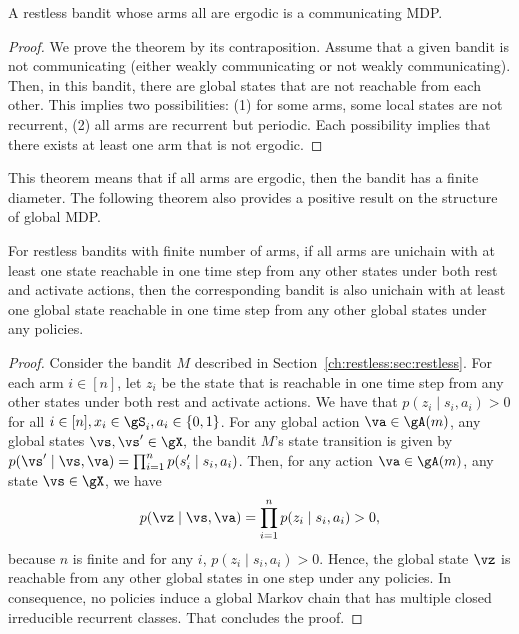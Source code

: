 \begin{thm}
    \label{thm:aperiodic_RB_comm} A restless bandit whose arms all are ergodic is a communicating MDP.
\end{thm}
\begin{proof}
    We prove the theorem by its contraposition. Assume that a given bandit is not communicating (either weakly communicating or not weakly communicating).
    Then, in this bandit, there are global states that are not reachable from each other.
    This implies two possibilities: (1) for some arms, some local states are not recurrent, (2) all arms are recurrent but periodic.
    Each possibility implies that there exists at least one arm that is not ergodic.
\end{proof}
This theorem means that if all arms are ergodic, then the bandit has a finite diameter.
The following theorem also provides a positive result on the structure of global MDP.

\begin{thm}
    \label{thm:unichain}
    For restless bandits with finite number of arms, if all arms are unichain with at least one state reachable in one time step from any other states under both rest and activate actions, then the corresponding bandit is also unichain with at least one global state reachable in one time step from any other global states under any policies.
\end{thm}
\begin{proof}
    Consider the bandit $M$ described in Section~\ref{ch:restless:sec:restless}.
    For each arm $i\in[n]$, let $z_i$ be the state that is reachable in one time step from any other states under both rest and activate actions.
    We have that $p(z_i \mid s_i, a_i)>0$ for all $i\in[n], x_i\in\gS_i,a_i\in\{0,1\}$.
    For any global action $\va\in\gA(m)$, any global states $\vs,\vs'\in\gX,$ the bandit $M$'s state transition is given by ${p(\vs' \mid \vs, \va) =\prod_{i=1}^n p(s'_i \mid s_i, a_i)}$.
    Then, for any action $\va\in\gA(m)$, any state $\vs\in\gX$, we have
    \begin{align*}
        p(\vz \mid \vs, \va) =\prod_{i=1}^n p(z_i \mid s_i,a_i) > 0,
    \end{align*}
    because $n$ is finite and for any $i$, $p(z_i \mid s_i, a_i)>0$.
    Hence, the global state $\vz$ is reachable from any other global states in one step under any policies.
    In consequence, no policies induce a global Markov chain that has multiple closed irreducible recurrent classes.
    That concludes the proof.
\end{proof}

